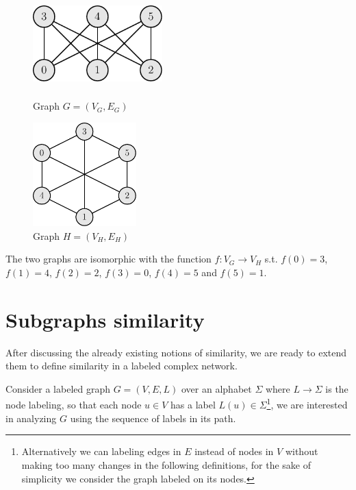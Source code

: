 \begin{esempio}
	\begin{figure}[h]
		\centering
		\begin{minipage}[t]{.45\textwidth}
			\centering
			\includegraphics[width=5cm,height=3.33cm]{figure/figure-2-3}
			\caption{Graph $G=(V_G, E_G)$}
		\end{minipage}\hfill
		\begin{minipage}[t]{.45\textwidth}
			\centering
			\includegraphics[width=4cm,height=4cm]{figure/figure-2-4}
			\caption{Graph $H=(V_H, E_H)$}
		\end{minipage}
	\end{figure}
	
	The two graphs are isomorphic with the function $f : V_{G} \rightarrow V_{H}$ s.t. $f(0) = 3$, $f(1) = 4$, $f(2) = 2$, $f(3) = 0$, $f(4) = 5$ and $f(5) = 1$. 
	
\end{esempio}

\section{Subgraphs similarity}

After discussing the already existing notions of similarity, we are ready to extend them to define similarity in a labeled complex network.\medskip

Consider a labeled graph $G = (V, E, L)$ over an alphabet $\Sigma$ where $L \rightarrow \Sigma$ is the node labeling, so that each node $u \in V$ has a label $L(u) \in \Sigma$\footnote{Alternatively we can labeling edges in $E$ instead of nodes in $V$ without making too many changes in the following definitions, for the sake of simplicity we consider the graph labeled on its nodes.}, we are interested in analyzing $G$ using the sequence of labels in its path.\medskip

